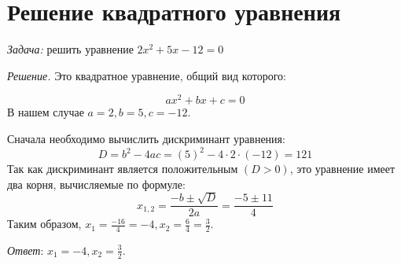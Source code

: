 \documentclass{article}
\begin{document}
\section{Решение квадратного уравнения}

\textit{Задача:} решить уравнение $ 2x^2 + 5x - 12 = 0 $

\textit{Решение.} Это квадратное уравнение, общий вид которого:

\[
ax^2 + bx + c = 0
\]
В нашем случае $ a = 2, b = 5, c = -12 $.

Сначала необходимо вычислить дискриминант уравнения:
\[
D = b^2 - 4ac = (5)^2 - 4 \cdot 2 \cdot (-12) = 121
\]
Так как дискриминант является положительным $ (D > 0) $, это уравнение
имеет два корня, вычисляемые по формуле:
\[
x_{1,2} = \frac{-b \pm \sqrt{D}}{2a} = \frac{-5 \pm 11}{4}
\]
Таким образом, $ x_1 = \frac{-16}{4} = -4, x_2 = \frac{6}{4} = \frac{3}{2} $.

\textit{Ответ}: $ x_1 = -4, x_2 = \frac{3}{2} $.
\end{document}
